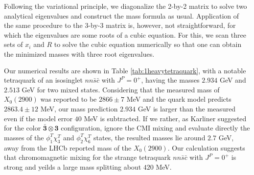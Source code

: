 \documentclass[prt,twocolumn,floatfix,nofootinbib]{revtex4}
\begin{document}
Following the variational principle, we diagonalize the 2-by-2 matrix to solve two analytical eigenvalues and construct the mass formula as usual.
Application of the same procedure to the 3-by-3 matrix is, however, not straightforward, for which the eigenvalues are some roots of a cubic equation.
For this, we scan three sets of $x_{i}$ and $R$ to solve the cubic equation numerically so that one can obtain the minimized masses with three root eigenvalues.

Our numerical results are shown in Table \ref{tab:1heavytetraquark}, with a notable tetraquark of an isosinglet $nn\bar{s}\bar{c}$ with $J^{P}=0^{+}$, having the masses $2.934$ GeV and $2.513$ GeV for two mixed states.
Considering that the measured mass of $X_{0}(2900)$ was reported to be $2866\pm 7$ MeV \cite{LHCb:2020kd} and the quark model predicts $2863.4\pm 12$ MeV\cite{Karliner:2020vsi}, our mass prediction $2.934$ GeV is larger than the measured even if the model error $40$ MeV is subtracted.
If we rather, as Karliner suggested for the color $\boldsymbol{\bar{3}}\otimes\boldsymbol{3}$ configuration, ignore the CMI mixing and evaluate directly the masses of the $\phi_{1}^{T}\chi_{3}^{T}$ and $\phi_{2}^{T}\chi_{6}^{T}$ states, the resulted masses lie around $2.7$ GeV, away from the LHCb reported mass of the $X_{0}(2900)$. Our calculation suggests that  chromomagnetic mixing for the strange tetraquark $nn\bar{s}\bar{c}$ with $J^{P}=0^{+}$ is strong and yeilds a large mass splitting about $420$ MeV.
\end{document}
